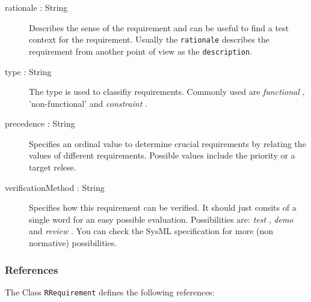 \begin{description}
	\item[rationale : String] Describes the sense of the requirement and can be useful to find a test context for the requirement.
Usually the \verb|rationale| describes the requirement from another point of view as the \verb|description|.
	\item[type : String] The type is used to classifiy requirements.
Commonly used are \emph{functional} , 'non-functional' and \emph{constraint} .
	\item[precedence : String] Specifies an ordinal value to determine crucial requirements by relating the values of different requirements.
Possible values include the priority or a target relese.
	\item[verificationMethod : String] Specifies how this requirement can be verified.
It should just consits of a single word for an easy possible evaluation.
Possibilities are: \emph{test} , \emph{demo}  and \emph{review} . You can check the SysML specification for more (non normative) possibilities.
\end{description}
\subsubsection{References}

The Class \verb|RRequirement| defines the following references:


